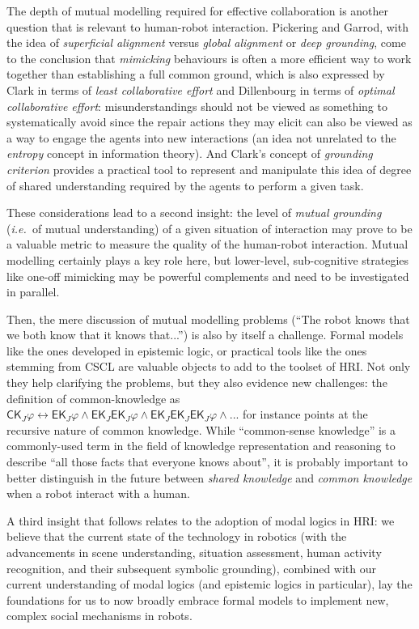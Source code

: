 \documentclass{sig-alternate}
\newcommand{\ie}{{\textit{i.e.~}}}
\begin{document}
The depth of mutual modelling required for effective collaboration is another
question that is relevant to human-robot interaction. Pickering and Garrod, with
the idea of \emph{superficial alignment} versus \emph{global alignment} or
\emph{deep grounding}, come to the conclusion that \emph{mimicking} behaviours
is often a more efficient way to work together than establishing a full common
ground, which is also expressed by Clark in terms of \emph{least collaborative
effort} and Dillenbourg in terms of \emph{optimal collaborative effort}:
misunderstandings should not be viewed as something to systematically avoid
since the repair actions they may elicit can also be viewed as a way to engage
the agents into new interactions (an idea not unrelated to the \emph{entropy}
concept in information theory). And Clark's concept of \emph{grounding
criterion} provides a practical tool to represent and manipulate this idea of
degree of shared understanding required by the agents to perform a given task.

These considerations lead to a second insight: the level of \emph{mutual
grounding} (\ie of mutual understanding) of a given situation of interaction may
prove to be a valuable metric to measure the quality of the human-robot interaction.
Mutual modelling certainly plays a key role here, but lower-level, sub-cognitive
strategies like one-off mimicking may be powerful complements and need to be
investigated in parallel.

Then, the mere discussion of mutual modelling problems (``The robot knows
that we both know that it knows that...'') is also by itself a challenge. Formal
models like the ones developed in epistemic logic, or practical tools like the
ones stemming from CSCL are valuable objects to add to the toolset of HRI. Not
only they help clarifying the problems, but they also evidence new challenges:
the definition of common-knowledge as $\mathsf{CK}_J\varphi \leftrightarrow
\mathsf{EK}_J\varphi \wedge \mathsf{EK}_J\mathsf{EK}_J\varphi \wedge
\mathsf{EK}_J\mathsf{EK}_J\mathsf{EK}_J\varphi \wedge ...$ for instance points
at the recursive nature of common knowledge. While ``common-sense knowledge'' is
a commonly-used term in the field of knowledge representation and reasoning to
describe ``all those facts that everyone knows about'', it is probably important
to better distinguish in the future between \emph{shared knowledge} and
\emph{common knowledge} when a robot interact with a human.

A third insight that follows relates to the adoption of modal logics in HRI: we
believe that the current state of the technology in robotics (with the 
advancements in scene understanding, situation assessment, human activity
recognition, and their subsequent symbolic grounding), combined with our current
understanding of modal logics (and epistemic logics in particular), lay the
foundations for us to now broadly embrace formal models to implement new, complex
social mechanisms in robots.
\end{document}
